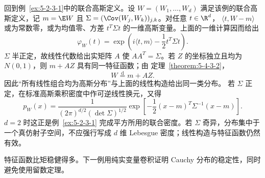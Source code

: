 \begin{remark}[联合高斯分布的特征函数表示]\label{rem:5-4-3-joint-gaussian-recovery}
回到例~\ref{ex:5-2-3-1}中的联合高斯定义。设
$W=(W_1,\ldots,W_d)$ 满足该例的联合高斯定义，记
$m=\E W$ 且 $\Sigma=(\Cov(W_j,W_k))_{j,k}$。对任意 $t\in\R^d$，
$\langle t,W-m\rangle$ 或为常数零，或为均值零、方差
$t^T\Sigma t$ 的一维高斯变量。上面的一维计算因而给出
\[
 \varphi_W(t)=\exp\!\left(i\langle t,m\rangle-\frac12t^T\Sigma t\right).
\]
$\Sigma$ 半正定，故线性代数给出实矩阵 $A$ 使 $AA^T=\Sigma$。若
$Z$ 的坐标独立且均为 $N(0,1)$，则 $m+AZ$ 具有同一特征函数；由
定理~\ref{theorem:5-4-3-2}，
\[
 W\overset{\mathrm d}=m+AZ.
\]
因此“所有线性组合均为高斯分布”与上面的线性构造给出同一类分布。
若 $\Sigma$ 正定，在标准高斯乘积密度中作可逆线性换元，又得
\[
 p_W(x)=\frac{1}{(2\pi)^{d/2}(\det\Sigma)^{1/2}}
 \exp\!\left[-\frac12(x-m)^T\Sigma^{-1}(x-m)\right].
\]
$d=2$ 时这正是例~\ref{ex:5-2-3-1} 完成平方所用的联合密度。若
$\Sigma$ 奇异，分布集中于一个真仿射子空间，不应强行写成
$d$ 维 Lebesgue 密度；线性构造与特征函数仍然有效。
\end{remark}

特征函数比矩稳健得多。下一例用纯实变量卷积证明 Cauchy 分布的稳定性，同时避免使用留数定理。

